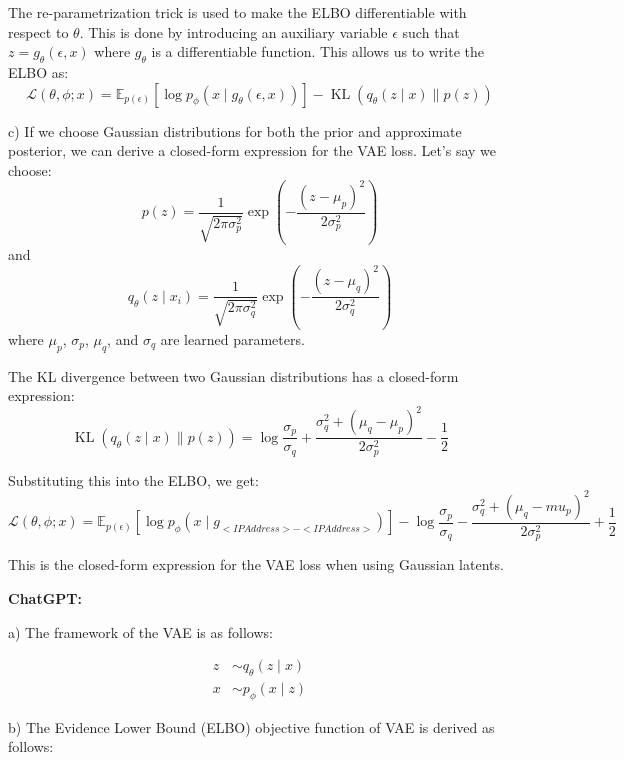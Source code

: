 \documentclass{homework}
\begin{document}
The re-parametrization trick is used to make the ELBO differentiable with respect to $\theta$. This is done by introducing an auxiliary variable $\epsilon$ such that $z = g_{\theta}(\epsilon, x)$ where $g_{\theta}$ is a differentiable function. This allows us to write the ELBO as:
$$
\mathcal{L}(\theta, \phi ; x)=\mathbb{E}_{p(\epsilon)}[\log p_{\phi}(x \mid g_{\theta}(\epsilon, x))]-\operatorname{KL}\left(q_{\theta}(z \mid x) \| p(z)\right)
$$

c) If we choose Gaussian distributions for both the prior and approximate posterior, we can derive a closed-form expression for the VAE loss. Let's say we choose:
$$
p(z) = \frac{1}{\sqrt{2 \pi \sigma_{p}^{2}}} \exp \left(-\frac{\left(z-\mu_{p}\right)^{2}}{2 \sigma_{p}^{2}}\right)
$$
and
$$
q_{\theta}\left(z \mid x_{i}\right) = \frac{1}{\sqrt{2 \pi \sigma_{q}^{2}}} \exp \left(-\frac{\left(z-\mu_{q}\right)^{2}}{2 \sigma_{q}^{2}}\right)
$$
where $\mu_p$, $\sigma_p$, $\mu_q$, and $\sigma_q$ are learned parameters.

The KL divergence between two Gaussian distributions has a closed-form expression:
$$
\operatorname{KL}\left(q_{\theta}(z \mid x) \| p(z)\right) = \log \frac{\sigma_p}{\sigma_q} + \frac{\sigma_q^2 + (\mu_q - \mu_p)^2}{2\sigma_p^2} - \frac{1}{2}
$$

Substituting this into the ELBO, we get:
$$
\mathcal{L}(\theta, \phi ; x)=\mathbb{E}_{p(\epsilon)}[\log p_{\phi}(x \mid g_{<IPAddress>-<IPAddress>})]- \log \frac{\sigma_p}{\sigma_q} - \frac{\sigma_q^2 + (\mu_q - mu_p)^2}{2\sigma_p^2} + \frac{1}{2}
$$

This is the closed-form expression for the VAE loss when using Gaussian latents.

\textbf{ChatGPT:}

a) The framework of the VAE is as follows: 

$$
\begin{aligned}
z & \sim q_{\theta}(z \mid x) \\
x & \sim p_{\phi}(x \mid z)
\end{aligned}
$$

b) The Evidence Lower Bound (ELBO) objective function of VAE is derived as follows: 
\end{document}
